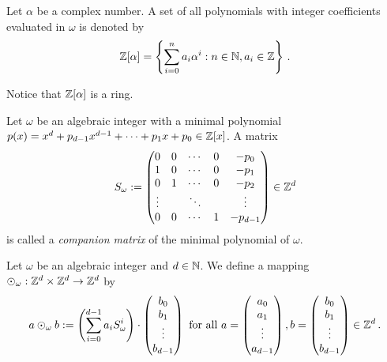 \begin{defn}
Let $\alpha$ be a complex number. A set of all polynomials with integer coefficients evaluated in $\omega$ is denoted by
$$
    \mathbb{Z}[\alpha] =\left\{\sum_{i=0}^n a_i \alpha^i : n\in\mathbb{N}, a_i\in\mathbb{Z} \right\}\,.
$$
\end{defn}
Notice that $\mathbb{Z}[\alpha]$ is a ring.


\begin{defn}
Let $\omega$ be an algebraic integer with a minimal polynomial $p(x)=x^d +p_{d-1}x^{d-1}+ \cdots + p_1 x+p_0 \in \mathbb{Z}[x]$. A matrix 
$$
S_\omega := \begin{pmatrix}
            0 & 0 & \cdots & 0 & -p_0 \\
            1 & 0 & \cdots & 0 & -p_1 \\
            0 & 1 & \cdots & 0 & -p_2 \\
            \vdots &   & \ddots & & \vdots \\
            0 & 0 & \cdots & 1 & -p_{d-1} 
            \end{pmatrix} \in \mathbb{Z}^d
$$
is called a \emph{companion matrix} of the minimal polynomial of $\omega$.
\end{defn}

\begin{defn}
Let $\omega$ be an algebraic integer and $d\in\mathbb{N}$. We define a mapping $\odot_\omega: \mathbb{Z}^d \times \mathbb{Z}^d \rightarrow \mathbb{Z}^d$ by 
$$
a \odot_\omega b := \left(\sum_{i=0}^{d-1} {a}_i S_\omega^i\right)\cdot \begin{pmatrix} {b}_0 \\ {b}_1 \\ \vdots \\ {b}_{d-1} \end{pmatrix} \text{ for all } a=\begin{pmatrix} {a}_0 \\ {a}_1 \\ \vdots \\ {a}_{d-1} \end{pmatrix}, b=\begin{pmatrix} {b}_0 \\ {b}_1 \\ \vdots \\ {b}_{d-1} \end{pmatrix} \in \mathbb{Z}^d\,.
$$ 
\end{defn}



